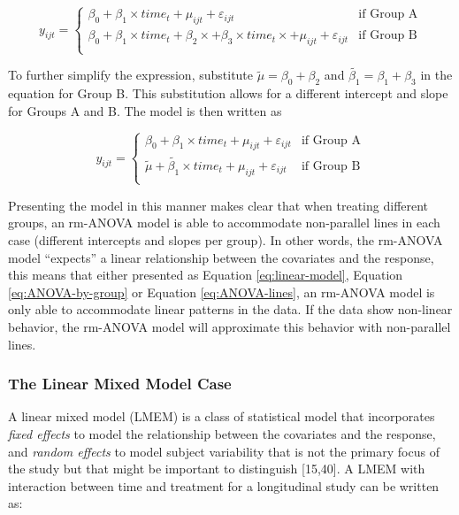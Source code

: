 \documentclass[
]{article}
\begin{document}
\begin{equation}
y_{ijt} = \begin{cases}
\beta_0 + \beta_1\times time_{t}+\mu_{ijt}+\varepsilon_{ijt}   & \mbox{if Group A}\\
\beta_0 + \beta_1 \times time_{t} + \beta_2 \times +\beta_3 \times time_{t} \times +\mu_{ijt}+\varepsilon_{ijt}  & \mbox{if Group B}\\
\end{cases}
\label{eq:ANOVA-by-group}
\end{equation}

To further simplify the expression, substitute \(\widetilde{\mu}=\beta_0+\beta_{2}\) and \(\widetilde{\beta_{1}}=\beta_{1}+\beta_{3}\) in the equation for Group B. This substitution allows for a different intercept and slope for Groups A and B. The model is then written as

\begin{equation}
y_{ijt} = \begin{cases}
\beta_0 + \beta_1\times time_{t}+\mu_{ijt}+\varepsilon_{ijt}   & \mbox{if Group A}\\
\widetilde{\mu} + \widetilde{\beta_1} \times time_{t} +\mu_{ijt}+\varepsilon_{ijt}  & \mbox{if Group B}\\
\end{cases}
\label{eq:ANOVA-lines}
\end{equation}

Presenting the model in this manner makes clear that when treating different groups, an rm-ANOVA model is able to accommodate non-parallel lines in each case (different intercepts and slopes per group). In other words, the rm-ANOVA model ``expects'' a linear relationship between the covariates and the response, this means that either presented as Equation \eqref{eq:linear-model}, Equation \eqref{eq:ANOVA-by-group} or Equation \eqref{eq:ANOVA-lines}, an rm-ANOVA model is only able to accommodate linear patterns in the data. If the data show non-linear behavior, the rm-ANOVA model will approximate this behavior with non-parallel lines.

\hypertarget{the-linear-mixed-model-case}{%
\subsubsection{The Linear Mixed Model Case}\label{the-linear-mixed-model-case}}

A linear mixed model (LMEM) is a class of statistical model that incorporates \emph{fixed effects} to model the relationship between the covariates and the response, and \emph{random effects} to model subject variability that is not the primary focus of the study but that might be important to distinguish {[}15,40{]}. A LMEM with interaction between time and treatment for a longitudinal study can be written as:
\end{document}
